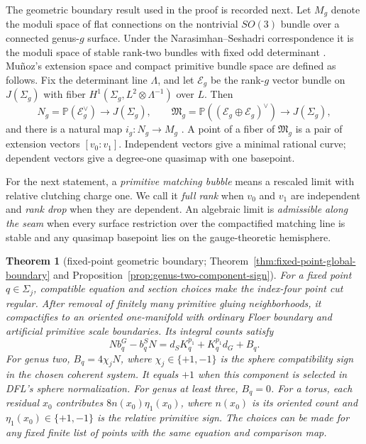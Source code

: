 \documentclass[11pt]{amsart}
\theoremstyle{definition}
\theoremstyle{remark}
\theoremstyle{plain}
\newtheorem{letterresult}{Theorem}
\newcommand{\PP}{\mathbb{P}}
\newcommand{\cE}{\mathcal{E}}
\newcommand{\frakM}{\mathfrak{M}}
\begin{document}
The geometric boundary result used in the proof is recorded next. Let
$M_g$ denote the moduli space of flat connections on the
nontrivial $SO(3)$ bundle over a connected genus-$g$ surface.  Under the
Narasimhan--Seshadri correspondence it is the moduli space of stable
rank-two bundles with fixed odd determinant \cite{NarSes65}.  Mu\~noz's
extension space and compact primitive bundle space are defined as follows.
Fix the determinant line $\Lambda$, and let $\cE_g$ be the rank-$g$ vector
bundle on $J(\Sigma_g)$ with fiber
$H^1(\Sigma_g,L^2\otimes\Lambda^{-1})$ over $L$.  Then
\begin{equation}\label{eq:intro-munoz-spaces}
 N_g=\PP(\cE_g^\vee)\longrightarrow J(\Sigma_g),
 \qquad
 \frakM_g=\PP((\cE_g\oplus\cE_g)^\vee)
       \longrightarrow J(\Sigma_g),
\end{equation}
and there is a natural map $i_g:N_g\to M_g$
\cite{Munoz99b}.  A point of a fiber of $\frakM_g$ is a pair of extension
vectors $[v_0:v_1]$.  Independent vectors give a minimal rational curve;
dependent vectors give a degree-one quasimap with one basepoint.

For the next statement, a \emph{primitive matching bubble} means a rescaled
limit with relative clutching charge one.  We call it \emph{full rank} when
$v_0$ and $v_1$ are independent and \emph{rank drop} when they are dependent.
An algebraic limit is \emph{admissible along the seam} when every surface
restriction over the compactified matching line is stable and any quasimap
basepoint lies on the gauge-theoretic hemisphere.

\begin{letterresult}[fixed-point geometric boundary;
  Theorem~\ref{thm:fixed-point-global-boundary} and
  Proposition~\ref{prop:genus-two-component-sign}]
\label{thm:intro-compactification}
For a fixed point $q\in\Sigma_j$, compatible equation and section
choices make the index-four point cut regular. After removal of
finitely many primitive gluing neighborhoods, it compactifies to
an oriented one-manifold with ordinary Floer boundary and
artificial primitive scale boundaries. Its integral counts satisfy
\[
 Nb_q^G-b_q^S N=d_SK_q^{p_1}+K_q^{p_1}d_G+B_q.
\]
For genus two, $B_q=4\chi_jN$, where $\chi_j\in\{+1,-1\}$
is the sphere compatibility sign in the chosen coherent system.
It equals $+1$ when this component is selected in DFL's sphere
normalization. For genus at least three, $B_q=0$.
For a torus, each residual $x_0$ contributes
$8n(x_0)\eta_1(x_0)$, where $n(x_0)$ is its oriented count
and $\eta_1(x_0)\in\{+1,-1\}$ is the relative primitive sign.
The choices can be made for any fixed finite list of points
with the same equation and comparison map.
\end{letterresult}
\end{document}
